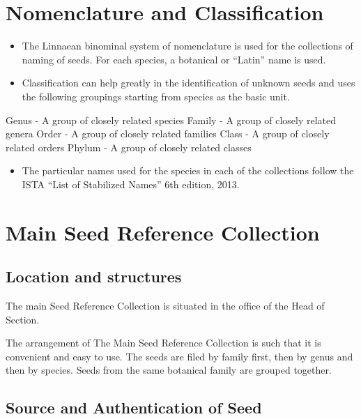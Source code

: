 \documentclass[]{book}
\providecommand{\tightlist}{%
  \setlength{\itemsep}{0pt}\setlength{\parskip}{0pt}}
\begin{document}
\section{Nomenclature and
Classification}\label{nomenclature-and-classification}

\begin{itemize}
\tightlist
\item
  The Linnaean binominal system of nomenclature is used for the
  collections of naming of seeds. For each species, a botanical or
  ``Latin'' name is used.
\item
  Classification can help greatly in the identification of unknown seeds
  and uses the following groupings starting from species as the basic
  unit.
\end{itemize}

Genus - A group of closely related species Family - A group of closely
related genera Order - A group of closely related families Class - A
group of closely related orders Phylum - A group of closely related
classes

\begin{itemize}
\tightlist
\item
  The particular names used for the species in each of the collections
  follow the ISTA ``List of Stabilized Names'' 6th edition, 2013.
\end{itemize}

\section{Main Seed Reference
Collection}\label{main-seed-reference-collection}

\subsection{Location and structures}\label{location-and-structures}

The main Seed Reference Collection is situated in the office of the Head
of Section.

The arrangement of The Main Seed Reference Collection is such that it is
convenient and easy to use. The seeds are filed by family first, then by
genus and then by species. Seeds from the same botanical family are
grouped together.

\subsection{Source and Authentication of
Seed}\label{source-and-authentication-of-seed}
\end{document}
